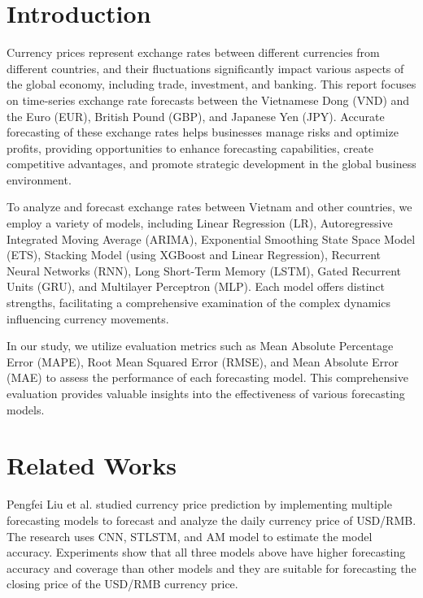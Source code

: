 \documentclass{ieeeojies}
\begin{document}
\titlepgskip=-15pt

\maketitle

\section{Introduction}
\label{sec:introduction}
\justify
Currency prices represent exchange rates between different currencies from different countries, and their fluctuations significantly impact various aspects of the global economy, including trade, investment, and banking. This report focuses on time-series exchange rate forecasts between the Vietnamese Dong (VND) and the Euro (EUR), British Pound (GBP), and Japanese Yen (JPY). Accurate forecasting of these exchange rates helps businesses manage risks and optimize profits, providing opportunities to enhance forecasting capabilities, create competitive advantages, and promote strategic development in the global business environment.

To analyze and forecast exchange rates between Vietnam and other countries, we employ a variety of models, including Linear Regression (LR), Autoregressive Integrated Moving Average (ARIMA), Exponential Smoothing State Space Model (ETS), Stacking Model (using XGBoost and Linear Regression), Recurrent Neural Networks (RNN), Long Short-Term Memory (LSTM), Gated Recurrent Units (GRU), and Multilayer Perceptron (MLP). Each model offers distinct strengths, facilitating a comprehensive examination of the complex dynamics influencing currency movements.

In our study, we utilize evaluation metrics such as Mean Absolute Percentage Error (MAPE), Root Mean Squared Error (RMSE), and Mean Absolute Error (MAE) to assess the performance of each forecasting model. This comprehensive evaluation provides valuable insights into the effectiveness of various forecasting models.

\section{Related Works}
\justify
Pengfei Liu et al. \cite{rw1} studied currency price prediction by implementing multiple forecasting models to forecast and analyze the daily currency price of USD/RMB. The research uses CNN, STLSTM, and AM model to estimate the model accuracy. Experiments show that all three models above have higher forecasting accuracy and coverage than other models and they are suitable for forecasting the closing price of the USD/RMB currency price.
\end{document}
